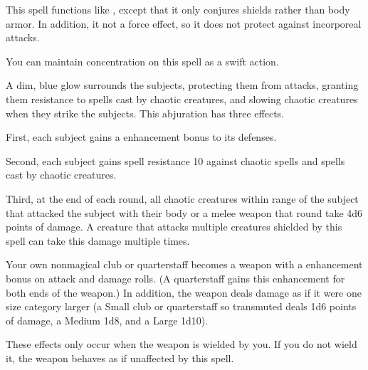 \begin{spelleffect}
    This spell functions like , except that it only conjures shields rather than body armor. In addition, it not a force effect, so it does not protect against incorporeal attacks.
\end{spelleffect}
\begin{spelleffect}
    You can maintain concentration on this spell as a swift action.
\end{spelleffect}

\spelldur{\durshort \dismissable}
\begin{spelleffect}
    A dim, blue glow surrounds the subjects, protecting them from attacks, granting them resistance to spells cast by chaotic creatures, and slowing chaotic creatures when they strike the subjects. This abjuration has three effects.
    \par First, each subject gains a  enhancement bonus to its defenses.
    \par Second, each subject gains spell resistance 10 against chaotic spells and spells cast by chaotic creatures.
    \par Third, at the end of each round, all chaotic creatures within \rngclose range of the subject that attacked the subject with their body or a melee weapon that round take 4d6 points of damage. A creature that attacks multiple creatures shielded by this spell can take this damage multiple times.
\end{spelleffect}

\spelldur{\durshort}
\begin{spelleffect}
    Your own nonmagical club or quarterstaff becomes a weapon with a  enhancement bonus on attack and damage rolls. \spellbonusscalingdescription (A quarterstaff gains this enhancement for both ends of the weapon.) In addition, the weapon deals damage as if it were one size category larger (a Small club or quarterstaff so transmuted deals 1d6 points of damage, a Medium 1d8, and a Large 1d10).
\end{spelleffect}
\begin{spellnotes}
    These effects only occur when the weapon is wielded by you. If you do not wield it, the weapon behaves as if unaffected by this spell.
\end{spellnotes}

